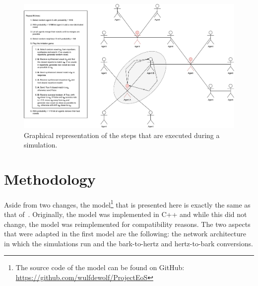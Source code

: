 \documentclass{article}
\begin{document}
\begin{figure}[t]
    \centering
    \includegraphics[width=\textwidth]{figures/simulation_diagram.pdf}
    \caption{Graphical representation of the steps that are executed during a simulation.}
    \label{fig:model}
\end{figure}

\section{Methodology\label{sec:methods}}
Aside from two changes, the model\footnote{The source code of the model can be found on GitHub:
    \url{https://github.com/wulfdewolf/ProjectEoS}} that is presented here is exactly the same as that
of~. Originally, the model was implemented in C++ and while this did
not change, the model was reimplemented for compatibility reasons. The two aspects that were adapted in  the first
model are the following: the network architecture in which the simulations run and the bark-to-hertz and hertz-to-bark
conversions.
\end{document}
